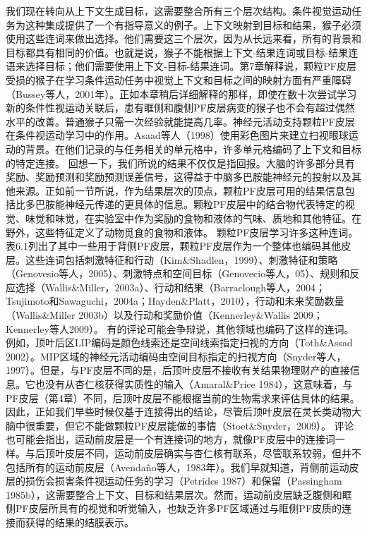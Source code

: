 我们现在转向从上下文生成目标，这需要整合所有三个层次结构。条件视觉运动任务为这种集成提供了一个有指导意义的例子。上下文映射到目标和结果，猴子必须使用这些连词来做出选择。他们需要这三个层次，因为从长远来看，所有的背景和目标都具有相同的价值。也就是说，猴子不能根据上下文-结果连词或目标-结果连语来选择目标；他们需要使用上下文-目标-结果连词。第7章解释说，颗粒PF皮层受损的猴子在学习条件运动任务中视觉上下文和目标之间的映射方面有严重障碍（Bussey等人，2001年）。正如本章稍后详细解释的那样，即使在数十次尝试学习新的条件性视运动关联后，患有眶侧和腹侧PF皮层病变的猴子也不会有超过偶然水平的改善。普通猴子只需一次经验就能提高几率。神经元活动支持颗粒PF皮层在条件视运动学习中的作用。Asaad等人（1998）使用彩色图片来建立扫视眼球运动的背景。在他们记录的与任务相关的单元格中，许多单元格编码了上下文和目标的特定连接。
回想一下，我们所说的结果不仅仅是指回报。大脑的许多部分具有奖励、奖励预测和奖励预测误差信号，这得益于中脑多巴胺能神经元的投射以及其他来源。正如前一节所说，作为结果层次的顶点，颗粒PF皮层可用的结果信息包括比多巴胺能神经元传递的更具体的信息。颗粒PF皮层中的结合物代表特定的视觉、味觉和味觉，在实验室中作为奖励的食物和液体的气味、质地和其他特征。在野外，这些特征定义了动物觅食的食物和液体。
颗粒PF皮层学习许多这种连词。表6.1列出了其中一些用于背侧PF皮层，颗粒PF皮层作为一个整体也编码其他皮层。这些连词包括刺激特征和行动（Kim\&Shadlen，1999）、刺激特征和策略（Genovesio等人，2005）、刺激特点和空间目标（Genovecio等人，05）、规则和反应选择（Wallis\&Miller，2003a）、行动和结果（Barraclough等人，2004；Tsujimoto和Sawaguchi，2004a；Hayden\&Platt，2010），行动和未来奖励数量（Wallis\&Miller 2003b）以及行动和奖励价值（Kennerley\&Wallis 2009；Kennerley等人2009）。
有的评论可能会争辩说，其他领域也编码了这样的连词。例如，顶叶后区LIP编码是颜色线索还是空间线索指定扫视的方向（Toth\&Assad 2002）。MIP区域的神经元活动编码由空间目标指定的扫视方向（Snyder等人，1997）。但是，与PF皮层不同的是，后顶叶皮层不接收有关结果物理财产的直接信息。它也没有从杏仁核获得实质性的输入（Amaral\&Price 1984），这意味着，与PF皮层（第4章）不同，后顶叶皮层不能根据当前的生物需求来评估具体的结果。因此，正如我们早些时候仅基于连接得出的结论，尽管后顶叶皮层在灵长类动物大脑中很重要，但它不能做颗粒PF皮层能做的事情（Stoet\&Snyder，2009）。
评论也可能会指出，运动前皮层是一个有连接词的地方，就像PF皮层中的连接词一样。与后顶叶皮层不同，运动前皮层确实与杏仁核有联系，尽管联系较弱，但并不包括所有的运动前皮层（Avendaño等人，1983年）。我们早就知道，背侧前运动皮层的损伤会损害条件视运动任务的学习（Petrides 1987）和保留（Passingham 1985b），这需要整合上下文、目标和结果层次。然而，运动前皮层缺乏腹侧和眶侧PF皮层所具有的视觉和听觉输入，也缺乏许多PF区域通过与眶侧PF皮质的连接而获得的结果的结膜表示。

